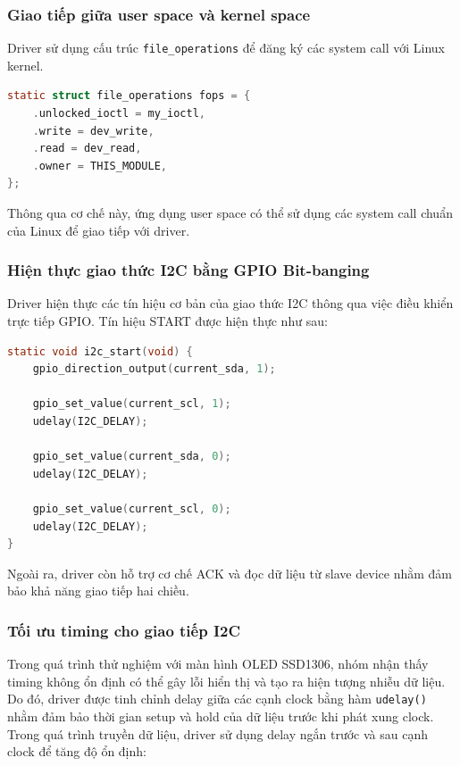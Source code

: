 \subsubsection{Giao tiếp giữa user space và kernel space}

Driver sử dụng cấu trúc \texttt{file\_operations} để đăng ký các system call với Linux kernel.

\begin{lstlisting}[style=thesisstyle, language=C]
static struct file_operations fops = {
    .unlocked_ioctl = my_ioctl,
    .write = dev_write,
    .read = dev_read,
    .owner = THIS_MODULE,
};
\end{lstlisting}

Thông qua cơ chế này, ứng dụng user space có thể sử dụng các system call chuẩn của Linux để giao tiếp với driver.

\subsubsection{Hiện thực giao thức I2C bằng GPIO Bit-banging}

Driver hiện thực các tín hiệu cơ bản của giao thức I2C thông qua việc điều khiển trực tiếp GPIO. Tín hiệu START được hiện thực như sau:

\begin{lstlisting}[style=thesisstyle, language=C]
static void i2c_start(void) {
    gpio_direction_output(current_sda, 1);

    gpio_set_value(current_scl, 1);
    udelay(I2C_DELAY);

    gpio_set_value(current_sda, 0);
    udelay(I2C_DELAY);

    gpio_set_value(current_scl, 0);
    udelay(I2C_DELAY);
}
\end{lstlisting}

Ngoài ra, driver còn hỗ trợ cơ chế ACK và đọc dữ liệu từ slave device nhằm đảm bảo khả năng giao tiếp hai chiều.

\subsubsection{Tối ưu timing cho giao tiếp I2C}

Trong quá trình thử nghiệm với màn hình OLED SSD1306, nhóm nhận thấy timing không ổn định có thể gây lỗi hiển thị và tạo ra hiện tượng nhiễu dữ liệu.
Do đó, driver được tinh chỉnh delay giữa các cạnh clock bằng hàm \texttt{udelay()} nhằm đảm bảo thời gian setup và hold của dữ liệu trước khi phát xung clock.
Trong quá trình truyền dữ liệu, driver sử dụng delay ngắn trước và sau cạnh clock để tăng độ ổn định:

